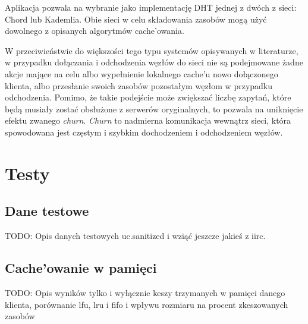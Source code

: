 \documentclass[a4paper,11pt]{scrartcl}
\newcommand{\s}{ }
\newcommand{\keszu}{cache'u}
\newcommand{\keszowania}{cache'owania}
\newcommand{\Keszowanie}{Cache'owanie}
\begin{document}
Aplikacja pozwala na wybranie jako implementację DHT jednej z dwóch z sieci: Chord lub Kademlia. Obie sieci w celu składowania zasobów mogą użyć dowolnego z opisanych algorytmów \keszowania.

W przeciwieństwie do większości tego typu systemów opisywanych w literaturze, w przypadku dołączania i odchodzenia węzłów do sieci nie są podejmowane żadne akcje mające na celu albo wypełnienie lokalnego \keszu\s nowo dołączonego klienta, albo przesłanie swoich zasobów pozostałym węzłom w przypadku odchodzenia. Pomimo, że takie podejście może zwiększać liczbę zapytań, które będą musiały zostać obsłużone z serwerów oryginalnych, to pozwala na uniknięcie efektu zwanego \textit{churn}. \textit{Churn} to nadmierna komunikacja wewnątrz sieci, która spowodowana jest częstym i szybkim dochodzeniem i odchodzeniem węzłów.  

\section{Testy}
\label{sect_tests}

\subsection{Dane testowe}
TODO: Opis danych testowych uc.sanitized i wziąć jeszcze jakieś z iirc.

\subsection{\Keszowanie\s w pamięci}
TODO: Opis wyników tylko i wyłącznie keszy trzymanych w pamięci danego klienta, porównanie lfu, lru i fifo i wpływu rozmiaru na procent zkeszowanych zasobów
\end{document}
